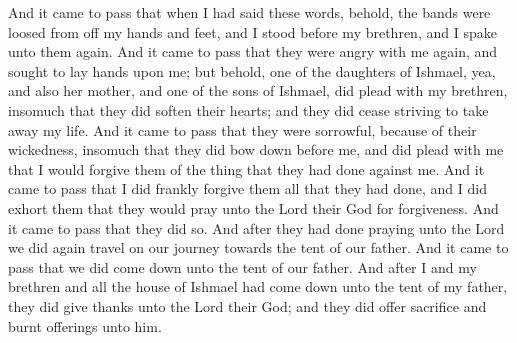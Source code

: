 \bverse \iffalse And it came to pass that when I had said these words, behold, the bands were loosed from off my hands and feet, and I stood before my brethren, and I spake unto them again. \fi
And it came to pass that when I had said these words, behold, the bands were loosed from off my hands and feet, and I stood before my brethren, and I spake unto them again.
\bverse \iffalse And it came to pass that they were angry with me again, and sought to lay hands upon me; but behold, one of the daughters of Ishmael, yea, and also her mother, and one of the sons of Ishmael, did plead with my brethren, insomuch that they did soften their hearts; and they did cease striving to take away my life. \fi
And it came to pass that they were angry with me again, and sought to lay hands upon me; but behold, one of the daughters of Ishmael, yea, and also her mother, and one of the sons of Ishmael, did plead with my brethren, insomuch that they did soften their hearts; and they did cease striving to take away my life.
\bverse \iffalse And it came to pass that they were sorrowful, because of their wickedness, insomuch that they did bow down before me, and did plead with me that I would forgive them of the thing that they had done against me. \fi
And it came to pass that they were sorrowful, because of their wickedness, insomuch that they did bow down before me, and did plead with me that I would forgive them of the thing that they had done against me.
\bverse \iffalse And it came to pass that I did frankly forgive them all that they had done, and I did exhort them that they would pray unto the Lord their God for forgiveness. And it came to pass that they did so. And after they had done praying unto the Lord we did again travel on our journey towards the tent of our father. \fi
And it came to pass that I did frankly forgive them all that they had done, and I did exhort them that they would pray unto the Lord their God for forgiveness. And it came to pass that they did so. And after they had done praying unto the Lord we did again travel on our journey towards the tent of our father.
\bverse \iffalse And it came to pass that we did come down unto the tent of our father. And after I and my brethren and all the house of Ishmael had come down unto the tent of my father, they did give thanks unto the Lord their God; and they did offer sacrifice and burnt offerings unto him. \fi
And it came to pass that we did come down unto the tent of our father. And after I and my brethren and all the house of Ishmael had come down unto the tent of my father, they did give thanks unto the Lord their God; and they did offer sacrifice and burnt offerings unto him.

